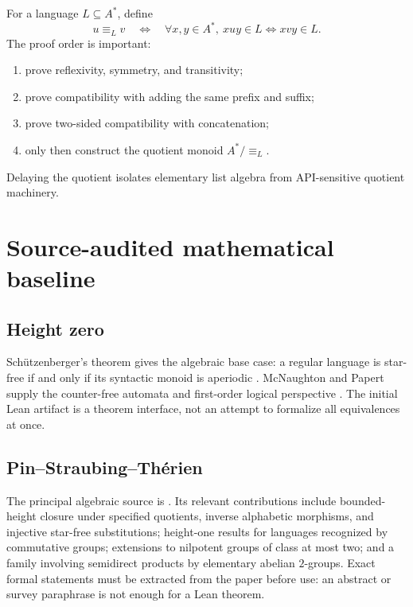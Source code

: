 \documentclass{amsart}
\begin{document}
For a language $L\subseteq A^\ast$, define
\[
  u\equiv_L v
  \quad\Longleftrightarrow\quad
  \forall x,y\in A^\ast,\ xuy\in L\Longleftrightarrow xvy\in L.
\]
The proof order is important:
\begin{enumerate}
  \item prove reflexivity, symmetry, and transitivity;
  \item prove compatibility with adding the same prefix and suffix;
  \item prove two-sided compatibility with concatenation;
  \item only then construct the quotient monoid $A^\ast/\!\equiv_L$.
\end{enumerate}
Delaying the quotient isolates elementary list algebra from API-sensitive quotient machinery.

\section{Source-audited mathematical baseline}

\subsection{Height zero}

Sch\"utzenberger's theorem gives the algebraic base case: a regular language is star-free if and only if its syntactic monoid is aperiodic \cite{schutzenberger1965finite}.  McNaughton and Papert supply the counter-free automata and first-order logical perspective \cite{mcnaughtonPapert1971counterfree}.  The initial Lean artifact is a theorem interface, not an attempt to formalize all equivalences at once.

\subsection{Pin--Straubing--Th\'erien}

The principal algebraic source is \cite{pinStraubingTherien1992}.  Its relevant contributions include bounded-height closure under specified quotients, inverse alphabetic morphisms, and injective star-free substitutions; height-one results for languages recognized by commutative groups; extensions to nilpotent groups of class at most two; and a family involving semidirect products by elementary abelian $2$-groups.  Exact formal statements must be extracted from the paper before use: an abstract or survey paraphrase is not enough for a Lean theorem.
\end{document}
